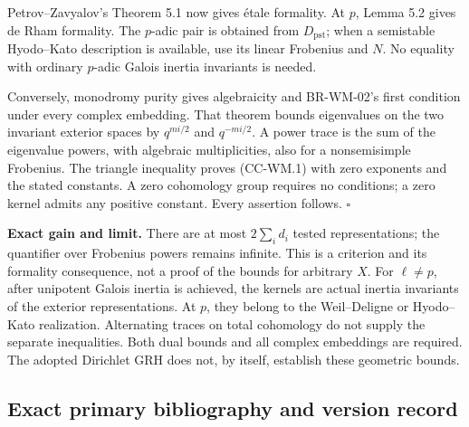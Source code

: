 Petrov--Zavyalov's Theorem 5.1 now gives étale formality. At \(p\),
Lemma 5.2 gives de Rham formality. The \(p\)-adic pair is obtained from
\(D_{\mathrm{pst}}\); when a semistable Hyodo--Kato description is
available, use its linear Frobenius and \(N\). No equality with ordinary
\(p\)-adic Galois inertia invariants is needed.

Conversely, monodromy purity gives algebraicity and BR-WM-02's first
condition under every complex embedding. That theorem bounds eigenvalues
on the two invariant exterior spaces by \(q^{mi/2}\) and \(q^{-mi/2}\).
A power trace is the sum of the eigenvalue powers, with algebraic
multiplicities, also for a nonsemisimple Frobenius. The triangle
inequality proves (CC-WM.1) with zero exponents and the stated
constants. A zero cohomology group requires no conditions; a zero kernel
admits any positive constant. Every assertion follows. \(\square\)

\textbf{Exact gain and limit.} There are at most \(2\sum_i d_i\) tested
representations; the quantifier over Frobenius powers remains infinite.
This is a criterion and its formality consequence, not a proof of the
bounds for arbitrary \(X\). For \(\ell\ne p\), after unipotent Galois
inertia is achieved, the kernels are actual inertia invariants of the
exterior representations. At \(p\), they belong to the Weil--Deligne or
Hyodo--Kato realization. Alternating traces on total cohomology do not
supply the separate inequalities. Both dual bounds and all complex
embeddings are required. The adopted Dirichlet GRH does not, by itself,
establish these geometric bounds.

\subsection{Exact primary bibliography and version
record}\label{exact-primary-bibliography-and-version-record}

